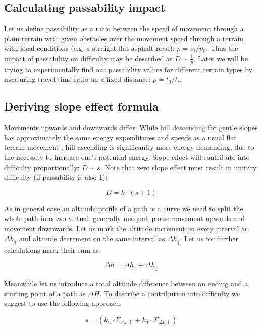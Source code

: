 \documentclass[12pt]{article}
\begin{document}
\subsection{Calculating passability impact}
Let us define passability as a ratio between the speed of movement through a plain terrain with given obstacles over the movement speed through a terrain with ideal conditions (e.g. a straight flat asphalt road): $p=\upsilon_{t}/\upsilon_{0}$. Thus the impact of passability on difficulty may be described as $D\sim\frac{1}{p}$. Later we will be trying to experimentally find out passability values for different terrain types by measuring travel time ratio on a fixed distance: $p=t_{0}/t_{t}$.


\subsection{Deriving slope effect formula}
Movements upwards and downwards differ. While hill descending for gentle slopes has approximately the same energy expenditures and speeds as a usual flat terrain movement \cite{mets-in-exercise}, hill ascending is significantly more energy demanding, due to the necessity to increase one's potential energy. Slope effect will contribute into difficulty proportionally: $D\sim{s}$. Note that zero slope effect must result in unitary difficulty (if passability is also 1):

\begin{equation} \label{eq:diff-se}
D=k\cdot(s+1)
\end{equation}

As in general case an altitude profile of a path is a curve we need to split the whole path into two virtual, generally unequal, parts: movement upwards and movement downwards. Let us mark the altitude increment on every interval as $\Delta{h_{\uparrow}}$ and altitude decrement on the same interval as $\Delta{h_{\downarrow}}$. Let us for further calculations mark their sum as

\begin{equation} \label{eq:alt-change}
\Delta{h}=\Delta{h_{\uparrow}}+\Delta{h_{\downarrow}}
\end{equation}

Meanwhile let us introduce a total altitude difference between an ending and a starting point of a path as $\Delta{H}$. To describe a contribution into difficulty we suggest to use the following approach:

\begin{equation} \label{eq:slope-effect}
s=(k_{u}\cdot\Sigma_{\Delta{h\uparrow}}+k_{d}\cdot\Sigma_{\Delta{h\downarrow}})
\end{equation}
\end{document}
